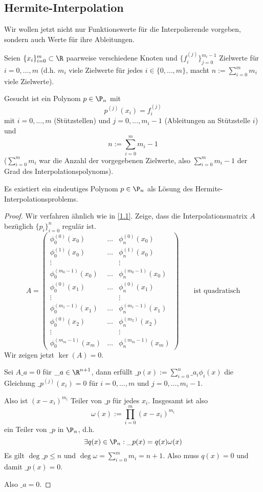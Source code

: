 \documentclass[11pt]{scrbook}
\begin{document}
\subsection{Hermite-Interpolation}

Wir wollen jetzt nicht nur Funktionswerte für die Interpolierende vorgeben, sondern auch Werte für ihre Ableitungen.

Seien $\{x_i\}_{i=0}^m \subset \R$ paarweise verschiedene Knoten und $\{f_i^{(j)}\}_{j=0}^{m_i-1}$ Zielwerte für $i=0,\dotsc, m$ (d.h. $m_i$ viele Zielwerte für jedes $i \in \{0,\dotsc, m\}$, macht $n := \sum_{i=0}^m m_i$ viele Zielwerte).

Gesucht ist ein Polynom $p\in \P_n$ mit 
\[
	p^{(j)}(x_i) =f_i^{(j)}
\]
mit $i=0,\dotsc,m$ (Stützstellen) und $j=0,\dotsc,m_i-1$ (Ableitungen an Stützstelle $i$) und 
\[
	n := \sum_{i=0}^m m_i - 1
\]
($\sum_{i=0}^m m_i$ war die Anzahl der vorgegebenen Zielwerte, also $\sum_{i=0}^m m_i -1$ der Grad des Interpolationspolynoms).

\begin{st}
	\label{1.19}
	Es existiert ein eindeutiges Polynom $p\in \P_n$ als Lösung des Hermite-Interpolationsproblems.
	\begin{proof}
		Wir verfahren ähnlich wie in \ref{1.1}.
		Zeige, dass die Interpolationsmatrix $A$ bezüglich $\{p_i\}_{i=0}^n$ regulär ist.
		\[
			A= \begin{pmatrix}
				\phi_0^{(0)}(x_0) &\hdots &\phi_n^{(0)}(x_0)\\
				\phi_0^{(1)}(x_0) &\hdots &\phi_n^{(1)}(x_0)\\
				\vdots &  & \vdots \\
				\phi_0^{(m_0-1)}(x_0)& \hdots &\phi_n^{(m_0-1)}(x_0)\\
				\phi_0^{(0)}(x_1) &\hdots &\phi_n^{(0)}(x_1)\\
				\vdots& & \vdots \\
				\phi_0^{(m_1-1)}(x_1)& \hdots &\phi_n^{(m_1-1)}(x_1)\\
				\phi_0^{(0)}(x_2) &\hdots &\phi_n^{(m_2)}(x_2)\\
				\vdots& & \vdots \\
				\phi_0^{(m_m-1)}(x_m) &\hdots &\phi_n^{(m_m-1)}(x_m)
			\end{pmatrix}
			\qquad \text{ist quadratisch}
		\]
		Wir zeigen jetzt $\ker(A) = 0$.

		Sei $A\_a = 0$ für $\_a\in \R^{n+1}$, dann erfüllt $\_p(x) := \sum_{i=0}^n \_a_i \phi_i(x)$ die Gleichung $\_p^{(j)}(x_i) = 0$ für $i=0,\dotsc,m$ und $j=0,\dotsc,m_i-1$.
		
		Also ist $(x-x_i)^{m_i}$ Teiler von $\_p$ für jedes $x_i$.
		Insgesamt ist also
		\[
			\omega(x) := \prod_{i=0}^m (x-x_i)^{m_i}
		\]
		ein Teiler von $\_p$ in $\P_n$, d.h.
		\[
			\exists q(x)\in \P_n : \_p(x) = q(x) \omega(x)
		\]
		Es gilt $\deg \_p \le n$ und $\deg \omega = \sum_{i=0}^m m_i = n+1$.
		Also muss $q(x)=0$ und damit $\_p(x) = 0$.

		Also $\_a=0$.
	\end{proof}
\end{st}
\end{document}

